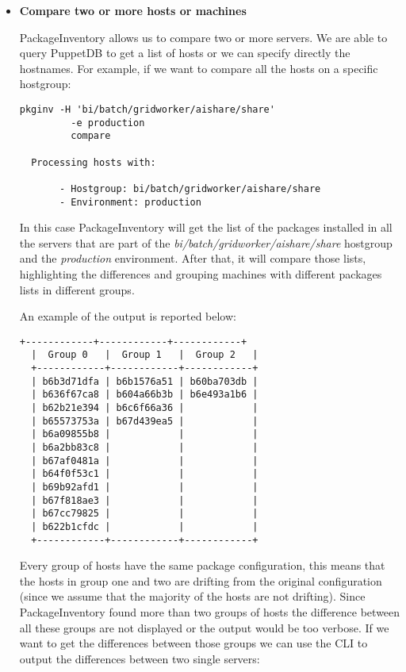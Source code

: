 \begin{itemize}
  \item \textbf{Compare two or more hosts or machines}

  PackageInventory allows us to compare two or more servers. We are able
  to query PuppetDB to get a list of hosts or we can specify directly the
  hostnames. For example, if we want to compare all the hosts on
  a specific hostgroup:
  
  \begin{lstlisting}[frame=single]
  pkginv -H 'bi/batch/gridworker/aishare/share'
         -e production
         compare
  
  Processing hosts with:
  
       - Hostgroup: bi/batch/gridworker/aishare/share
       - Environment: production
  \end{lstlisting}

  In this case PackageInventory will get the list of the packages
  installed in all the servers that are part of the
  \textit{bi/batch/gridworker/aishare/share} hostgroup and the
  \textit{production} environment. After that, it will compare those
  lists, highlighting the differences and grouping machines with different
  packages lists in different groups.

  An example of the output is reported below: \newline{}

  \begin{lstlisting}[frame=single]
  +------------+------------+------------+
  |  Group 0   |  Group 1   |  Group 2   |
  +------------+------------+------------+
  | b6b3d71dfa | b6b1576a51 | b60ba703db |
  | b636f67ca8 | b604a66b3b | b6e493a1b6 |
  | b62b21e394 | b6c6f66a36 |            |
  | b65573753a | b67d439ea5 |            |
  | b6a09855b8 |            |            |
  | b6a2bb83c8 |            |            |
  | b67af0481a |            |            |
  | b64f0f53c1 |            |            |
  | b69b92afd1 |            |            |
  | b67f818ae3 |            |            |
  | b67cc79825 |            |            |
  | b622b1cfdc |            |            |
  +------------+------------+------------+
  \end{lstlisting}

  Every group of hosts have the same package configuration, this means
  that the hosts in group one and two are drifting from the original
  configuration (since we assume that the majority of the hosts are not
  drifting). Since PackageInventory found more than two groups of hosts
  the difference between all these groups are not displayed or the output
  would be too verbose. If we want to get the differences between those
  groups we can use the CLI to output the differences between two single
  servers: \newline{}


\end{itemize}
